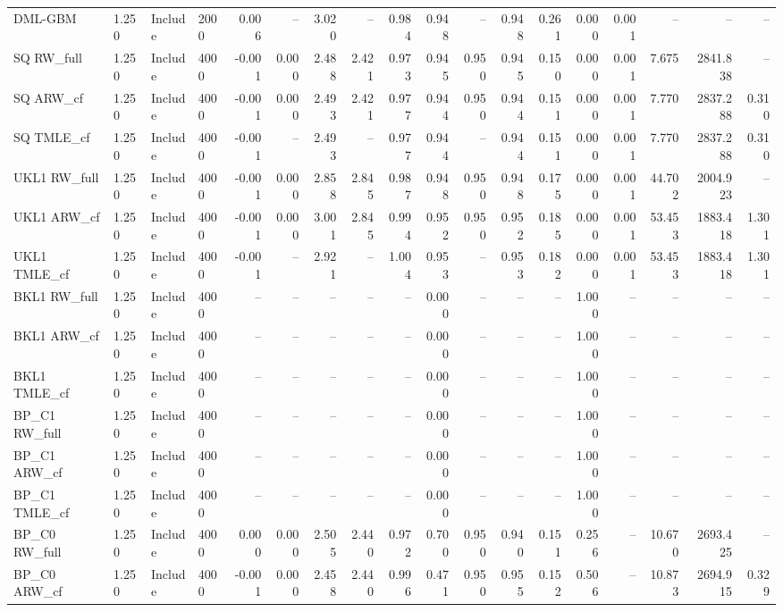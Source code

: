 \begin{tabular}{llllrrrrrrrrrrrrrr}
DML-GBM & 1.250 & Include & 2000 & 0.006 & -- & 3.020 & -- & 0.984 & 0.948 & -- & 0.948 & 0.261 & 0.000 & 0.001 & -- & -- & -- \\
SQ RW\_full & 1.250 & Include & 4000 & -0.001 & 0.000 & 2.488 & 2.421 & 0.973 & 0.945 & 0.950 & 0.945 & 0.150 & 0.000 & 0.001 & 7.675 & 2841.838 & -- \\
SQ ARW\_cf & 1.250 & Include & 4000 & -0.001 & 0.000 & 2.493 & 2.421 & 0.977 & 0.944 & 0.950 & 0.944 & 0.151 & 0.000 & 0.001 & 7.770 & 2837.288 & 0.310 \\
SQ TMLE\_cf & 1.250 & Include & 4000 & -0.001 & -- & 2.493 & -- & 0.977 & 0.944 & -- & 0.944 & 0.151 & 0.000 & 0.001 & 7.770 & 2837.288 & 0.310 \\
UKL1 RW\_full & 1.250 & Include & 4000 & -0.001 & 0.000 & 2.858 & 2.845 & 0.987 & 0.948 & 0.950 & 0.948 & 0.175 & 0.000 & 0.001 & 44.702 & 2004.923 & -- \\
UKL1 ARW\_cf & 1.250 & Include & 4000 & -0.001 & 0.000 & 3.001 & 2.845 & 0.994 & 0.952 & 0.950 & 0.952 & 0.185 & 0.000 & 0.001 & 53.453 & 1883.418 & 1.301 \\
UKL1 TMLE\_cf & 1.250 & Include & 4000 & -0.001 & -- & 2.921 & -- & 1.004 & 0.953 & -- & 0.953 & 0.182 & 0.000 & 0.001 & 53.453 & 1883.418 & 1.301 \\
BKL1 RW\_full & 1.250 & Include & 4000 & -- & -- & -- & -- & -- & 0.000 & -- & -- & -- & 1.000 & -- & -- & -- & -- \\
BKL1 ARW\_cf & 1.250 & Include & 4000 & -- & -- & -- & -- & -- & 0.000 & -- & -- & -- & 1.000 & -- & -- & -- & -- \\
BKL1 TMLE\_cf & 1.250 & Include & 4000 & -- & -- & -- & -- & -- & 0.000 & -- & -- & -- & 1.000 & -- & -- & -- & -- \\
BP\_C1 RW\_full & 1.250 & Include & 4000 & -- & -- & -- & -- & -- & 0.000 & -- & -- & -- & 1.000 & -- & -- & -- & -- \\
BP\_C1 ARW\_cf & 1.250 & Include & 4000 & -- & -- & -- & -- & -- & 0.000 & -- & -- & -- & 1.000 & -- & -- & -- & -- \\
BP\_C1 TMLE\_cf & 1.250 & Include & 4000 & -- & -- & -- & -- & -- & 0.000 & -- & -- & -- & 1.000 & -- & -- & -- & -- \\
BP\_C0 RW\_full & 1.250 & Include & 4000 & 0.000 & 0.000 & 2.505 & 2.440 & 0.972 & 0.700 & 0.950 & 0.940 & 0.151 & 0.256 & -- & 10.670 & 2693.425 & -- \\
BP\_C0 ARW\_cf & 1.250 & Include & 4000 & -0.001 & 0.000 & 2.458 & 2.440 & 0.996 & 0.471 & 0.950 & 0.955 & 0.152 & 0.506 & -- & 10.873 & 2694.915 & 0.329 \\

\end{tabular}

